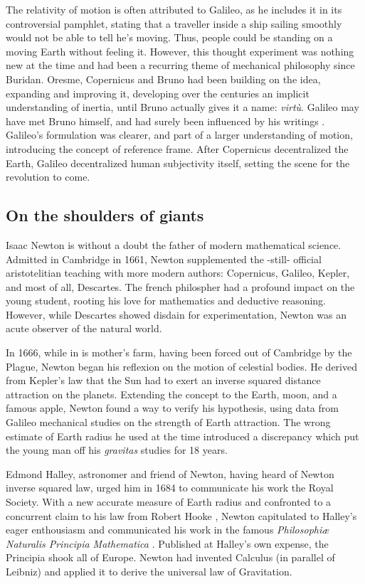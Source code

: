 The relativity of motion is often attributed to Galileo, as he includes it in its controversial pamphlet, stating that a traveller inside a ship sailing smoothly would not be able to tell he's moving. Thus, people could be standing on a moving Earth without feeling it. However, this thought experiment was nothing new at the time and had been a recurring theme of mechanical philosophy since Buridan. Oresme, Copernicus and Bruno had been building on the idea, expanding and improving it, developing over the centuries an implicit understanding of inertia, until Bruno actually gives it a name: \textit{virt\`u}. Galileo may have met Bruno himself, and had surely been influenced by his writings \citep{DeAngelis2015}. Galileo's formulation was clearer, and part of a larger understanding of motion, introducing the concept of reference frame. After Copernicus decentralized the Earth, Galileo decentralized human subjectivity itself, setting the scene for the revolution to come. 

\subsection*{On the shoulders of giants}

Isaac Newton is without a doubt the father of modern mathematical science. Admitted in Cambridge in 1661, Newton supplemented the -still- official aristotelitian teaching with more modern authors: Copernicus, Galileo, Kepler, and most of all, Descartes. The french philospher had a profound impact on the young student, rooting his love for mathematics and deductive reasoning. However, while Descartes showed disdain for experimentation, Newton was an acute observer of the natural world. 

In 1666, while in is mother's farm, having been forced out of Cambridge by the Plague, Newton began his reflexion on the motion of celestial bodies. He derived from Kepler's law that the Sun had to exert an inverse squared distance attraction on the planets. Extending the concept to the Earth, moon, and a famous apple, Newton found a way to verify his hypothesis, using data from Galileo mechanical studies on the strength of Earth attraction. The wrong estimate of Earth radius he used at the time introduced a discrepancy which put the young man off his \textit{gravitas} studies for 18 years.

Edmond Halley, astronomer and friend of Newton, having heard of Newton inverse squared law, urged him in 1684 to communicate his work the Royal Society. With a new accurate measure of Earth radius and confronted to a concurrent claim to his law from Robert Hooke \citep{Kramer1982}, Newton capitulated to Halley's eager enthousiasm and communicated his work in the famous \textit{Philosophiæ Naturalis Principia Mathematica} \citep{Newton1687}. Published at Halley's own expense, the Principia shook all of Europe. Newton had invented Calculus (in parallel of Leibniz) and applied it to derive the universal law of Gravitation.

